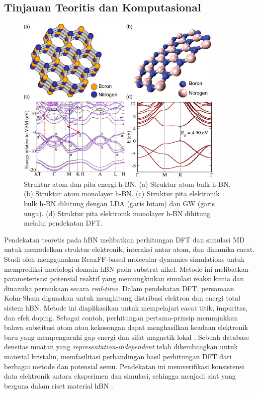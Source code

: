 \subsection{Tinjauan Teoritis dan Komputasional}
\begin{figure}[htbp]
  \centering
  \includegraphics[width=0.9\textwidth]{gambar/referensi_band_plot.jpeg}
  \caption{Struktur atom dan pita energi h‑BN. 
    (a) Struktur atom bulk h‑BN. 
    (b) Struktur atom monolayer h‑BN. 
    (c) Struktur pita elektronik bulk h‑BN dihitung dengan LDA (garis hitam) dan GW (garis ungu). 
    (d) Struktur pita elektronik monolayer h‑BN dihitung melalui pendekatan DFT. \citep{Zhang2020}}
  \label{fig:hbn_atomic_band_structure}
\end{figure}

Pendekatan teoretis pada hBN melibatkan perhitungan DFT dan simulasi MD untuk memodelkan struktur elektronik, interaksi antar atom, dan dinamika cacat.
Studi oleh \citep{Lele2022} menggunakan ReaxFF-based molecular dynamics simulations untuk memprediksi morfologi domain hBN pada substrat nikel.
Metode ini melibatkan parameterisasi potensial reaktif yang memungkinkan simulasi reaksi kimia dan dinamika permukaan secara \emph{real-time}.
Dalam pendekatan DFT, persamaan Kohn-Sham digunakan untuk menghitung distribusi elektron dan energi total sistem hBN.
Metode ini diaplikasikan untuk mempelajari cacat titik, impuritas, dan efek doping.
Sebagai contoh, perhitungan pertama-prinsip menunjukkan bahwa substitusi atom atau kekosongan dapat menghasilkan keadaan elektronik baru yang mempengaruhi gap energi dan sifat magnetik lokal \citep{Zhang2020}.
Sebuah database densitas muatan yang \emph{representation-independent} telah dikembangkan untuk material kristalin, memfasilitasi perbandingan hasil perhitungan DFT dari berbagai metode dan potensial semu.
Pendekatan ini memverifikasi konsistensi data elektronik antara eksperimen dan simulasi, sehingga menjadi alat yang berguna dalam riset material hBN \citep{Shen2022}.

